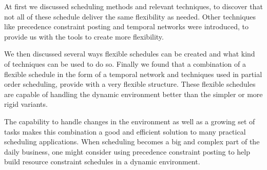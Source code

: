 \documentclass{article}
\begin{document}
At first we discussed scheduling methods and relevant techniques, to discover that not all of these schedule deliver the same flexibility as needed.
Other techniques like precedence constraint posting and temporal networks were introduced, to provide us with the tools to create more flexibility.

We then discussed several ways flexible schedules can be created and what kind of techniques can be used to do so.
Finally we found that a combination of a flexible schedule in the form of a temporal network and techniques used in partial order scheduling, provide with a very flexible structure.
These flexible schedules are capable of handling the dynamic environment better than the simpler or more rigid variants.

The capability to handle changes in the environment as well as a growing set of tasks makes this combination a good and efficient solution to many practical scheduling applications.
When scheduling becomes a big and complex part of the daily business, one might consider using precedence constraint posting to help build resource constraint schedules in a dynamic environment.


\newpage


\end{document}
